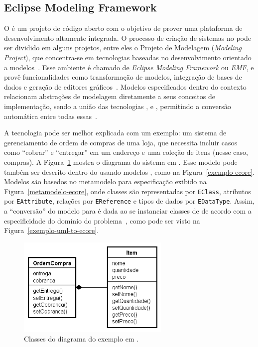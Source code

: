 \subsection{Eclipse Modeling Framework}
O \eclipse é um projeto de código aberto com o objetivo de prover uma plataforma de desenvolvimento altamente integrada. O processo de criação de sistemas no \eclipse pode ser dividido em alguns projetos, entre eles o Projeto de Modelagem (\textit{Modeling Project}), que concentra-se em tecnologias baseadas no desenvolvimento orientado a modelos~\cite{steinberg2008emf}. Esse ambiente é chamado de \textit{Eclipse Modeling Framework} ou \textit{EMF}, e provê funcionalidades como transformação de modelos, integração de bases de dados e geração de editores gráficos~\cite{steinberg2008emf}. Modelos especificados dentro do contexto \emf relacionam abstrações de modelagem diretamente a seus conceitos de implementação, sendo a união das tecnologias \uml, \xml e \java, permitindo a conversão automática entre todas essas~\cite{steinberg2008emf}. 


A tecnologia \emf pode ser melhor explicada com um exemplo: um sistema de gerenciamento de ordem de compras de uma loja, que necessita incluir casos como ``cobrar'' e ``entregar'' em um endereço e uma coleção de itens (nesse caso, compras). A Figura~\ref{exemplo-uml} mostra o diagrama do sistema em \uml. Esse modelo pode também ser descrito dentro do \emf usando modelos \ecore, como na Figura~\ref{exemplo-ecore}. Modelos \ecore são basedos no metamodelo para especificação exibido na Figura~\ref{metamodelo-ecore}, onde classes são representadas por \texttt{EClass}, atributos por \texttt{EAttribute}, relações por \texttt{EReference} e tipos de dados por \texttt{EDataType}. Assim, a ``conversão'' do modelo \uml para \ecore é dada ao se instanciar classes de \ecore de acordo com a especificidade do domínio do problema~\cite{steinberg2008emf}, como pode ser visto na Figura~\ref{exemplo-uml-to-ecore}. 

\begin{figure}
	\centering
	\includegraphics[width=0.65\textwidth]{figuras/exemplos-emf/exemplo-uml.png}
	\caption{Classes do diagrama do exemplo em \uml.}
	\label{exemplo-uml}
\end{figure}

